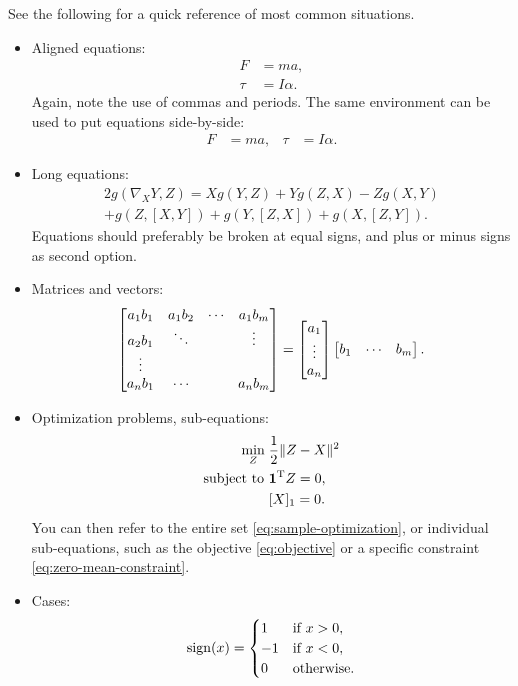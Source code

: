 \documentclass[letterpaper, 10 pt, conference]{ieeeconf}
\begin{document}
See the following for a quick reference of most common situations.
\begin{itemize}
\item Aligned equations:
  \begin{align}
      F&=ma,\\
      \tau&=I\alpha.
  \end{align}
  Again, note the use of commas and periods. The same environment can be used to put equations side-by-side:
  \begin{align}
    F&=ma, & \tau&=I\alpha.
  \end{align}
\item Long equations:
  \begin{multline}
    2g(\nabla_XY,Z)=Xg(Y,Z)+Yg(Z,X)-Zg(X,Y)\\
    +g(Z,[X,Y])+g(Y,[Z,X])+g(X,[Z,Y]).
  \end{multline}
  Equations should preferably be broken at equal signs, and plus or minus signs as second option.
  
\item Matrices and vectors:
  \begin{equation}
    \begin{bmatrix}
      a_1b_1 & a_1b_2 & \cdots &a_1 b_m\\
      a_2b_1 & \ddots && \vdots\\
      \vdots\\
      a_nb_1&\cdots&&a_nb_m
    \end{bmatrix}=\begin{bmatrix}a_1\\\vdots\\a_n\end{bmatrix}\begin{bmatrix}b_1 & \cdots & b_m\end{bmatrix}.
  \end{equation}
\item Optimization problems, sub-equations:
  \begin{subequations}
    \label{eq:sample-optimization}
    \begin{align}
      \min_{Z}\; & \frac{1}{2}\lVert Z-X\rVert^2\label{eq:objective}\\
      \textrm{subject to } &   \mathbf{1}^\mathrm{T} Z=0,\label{eq:zero-mean-constraint}\\
                 & [X]_1=0.
    \end{align}
  \end{subequations}
  You can then refer to the entire set \eqref{eq:sample-optimization}, or individual sub-equations, such as the objective \eqref{eq:objective} or a specific constraint \eqref{eq:zero-mean-constraint}.
\item Cases:
  \begin{equation}\label{eq:sign-def}
    \operatorname{sign}(x)=
    \begin{cases}
      1 & \textrm{if } x>0,\\
      -1 & \textrm{if } x<0,\\
      0 & \textrm{otherwise}.
    \end{cases}
  \end{equation}
\end{itemize}
\end{document}
